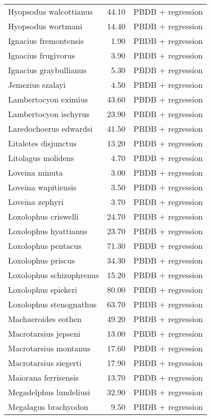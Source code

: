 \begin{table}[ht]
\begin{tabular}{lrl}
  Hyopsodus walcottianus & 44.10 & PBDB + regression \\ 
  Hyopsodus wortmani & 14.40 & PBDB + regression \\ 
  Ignacius fremontensis & 1.90 & PBDB + regression \\ 
  Ignacius frugivorus & 3.90 & PBDB + regression \\ 
  Ignacius graybullianus & 5.30 & PBDB + regression \\ 
  Jemezius szalayi & 4.50 & PBDB + regression \\ 
  Lambertocyon eximius & 43.60 & PBDB + regression \\ 
  Lambertocyon ischyrus & 23.90 & PBDB + regression \\ 
  Laredochoerus edwardsi & 41.50 & PBDB + regression \\ 
  Litaletes disjunctus & 13.20 & PBDB + regression \\ 
  Litolagus molidens & 4.70 & PBDB + regression \\ 
  Loveina minuta & 3.00 & PBDB + regression \\ 
  Loveina wapitiensis & 3.50 & PBDB + regression \\ 
  Loveina zephyri & 3.70 & PBDB + regression \\ 
  Loxolophus criswelli & 24.70 & PBDB + regression \\ 
  Loxolophus hyattianus & 23.70 & PBDB + regression \\ 
  Loxolophus pentacus & 71.30 & PBDB + regression \\ 
  Loxolophus priscus & 34.30 & PBDB + regression \\ 
  Loxolophus schizophrenus & 15.20 & PBDB + regression \\ 
  Loxolophus spiekeri & 80.00 & PBDB + regression \\ 
  Loxolophus stenognathus & 63.70 & PBDB + regression \\ 
  Machaeroides eothen & 49.20 & PBDB + regression \\ 
  Macrotarsius jepseni & 13.00 & PBDB + regression \\ 
  Macrotarsius montanus & 17.60 & PBDB + regression \\ 
  Macrotarsius siegerti & 17.90 & PBDB + regression \\ 
  Maiorana ferrisensis & 13.70 & PBDB + regression \\ 
  Megadelphus lundeliusi & 32.90 & PBDB + regression \\ 
  Megalagus brachyodon & 9.50 & PBDB + regression \\ 

\end{tabular}
\end{table}
